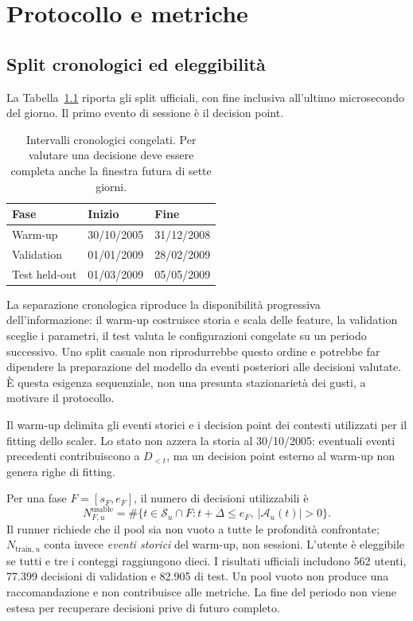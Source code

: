 \chapter{Protocollo e metriche}\label{ch:metodo}
\begingroup
\setlength{\parskip}{0pt}
\setlength{\abovedisplayskip}{5pt plus 1pt}
\setlength{\belowdisplayskip}{5pt plus 1pt}
\setlength{\abovedisplayshortskip}{3pt plus 1pt}
\setlength{\belowdisplayshortskip}{3pt plus 1pt}
\section{Split cronologici ed eleggibilità}
La Tabella~\ref{tab:split} riporta gli split ufficiali, con fine inclusiva all'ultimo microsecondo del giorno. Il primo evento di sessione è il decision point.
\begin{table}[htbp]\centering
\begin{tabular}{lll}\toprule Fase & Inizio & Fine\\\midrule
Warm-up & 30/10/2005 & 31/12/2008\\
Validation & 01/01/2009 & 28/02/2009\\
Test held-out & 01/03/2009 & 05/05/2009\\\bottomrule
\end{tabular}
\caption{Intervalli cronologici congelati. Per valutare una decisione deve essere completa anche la finestra futura di sette giorni.}\label{tab:split}
\end{table}

La separazione cronologica riproduce la disponibilità progressiva dell'informazione: il warm-up costruisce storia e scala delle feature, la validation sceglie i parametri, il test valuta le configurazioni congelate su un periodo successivo. Uno split casuale non riprodurrebbe questo ordine e potrebbe far dipendere la preparazione del modello da eventi posteriori alle decisioni valutate. È questa esigenza sequenziale, non una presunta stazionarietà dei gusti, a motivare il protocollo.

Il warm-up delimita gli eventi storici e i decision point dei contesti utilizzati per il fitting dello scaler. Lo stato non azzera la storia al 30/10/2005: eventuali eventi precedenti contribuiscono a $D_{<t}$, ma un decision point esterno al warm-up non genera righe di fitting.

Per una fase $F=[s_F,e_F]$, il numero di decisioni utilizzabili è
\begin{equation}
N_{F,u}^{\mathrm{usable}}=
\#\{t\in\mathcal S_u\cap F:t+\Delta\leq e_F,\
|\mathcal A_u(t)|>0\}.\label{eq:usable}
\end{equation}
Il runner richiede che il pool sia non vuoto a tutte le profondità confrontate; $N_{\mathrm{train},u}$ conta invece \emph{eventi storici} del warm-up, non sessioni. L'utente è eleggibile se tutti e tre i conteggi raggiungono dieci. I risultati ufficiali includono 562 utenti, 77.399 decisioni di validation e 82.905 di test. Un pool vuoto non produce una raccomandazione e non contribuisce alle metriche. La fine del periodo non viene estesa per recuperare decisioni prive di futuro completo.


